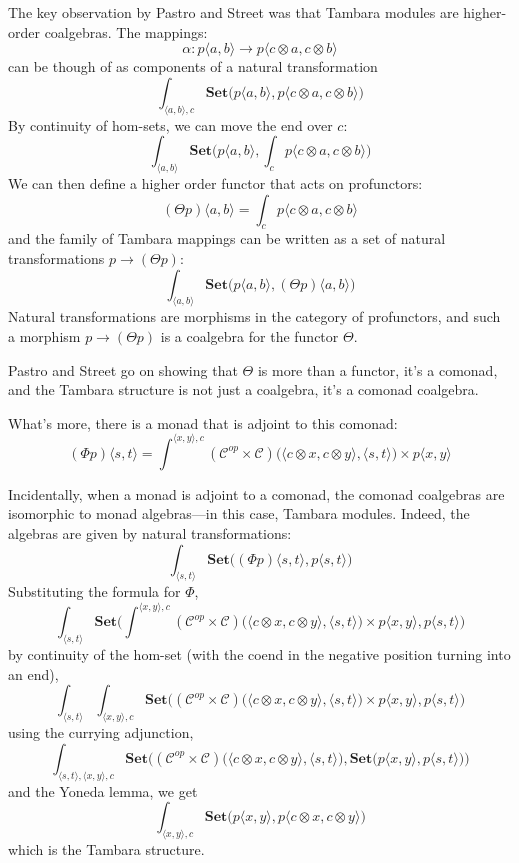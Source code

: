 \documentclass[11pt]{amsart}
\begin{document}
The key observation by Pastro and Street was that Tambara modules are higher-order coalgebras. The mappings:
\[ \alpha \colon p \langle a, b \rangle \to p\langle c \otimes a, c \otimes b \rangle \]
can be though of as components of a natural transformation
\[ \int_{\langle a, b \rangle, c} \mathbf{Set} \big( p \langle a, b \rangle, p\langle c \otimes a, c \otimes b \rangle \big) \]
By continuity of hom-sets, we can move the end over $c$:
\[ \int_{\langle a, b \rangle} \mathbf{Set} \big( p \langle a, b \rangle, \int_c p\langle c \otimes a, c \otimes b \rangle \big) \]
We can then define a higher order functor that acts on profunctors:
\[ (\Theta p)\langle a, b \rangle =  \int_c p\langle c \otimes a, c \otimes b \rangle \]
and the family of Tambara mappings can be written as a set of natural transformations $p \to (\Theta p)$:
\[ \int_{\langle a, b \rangle} \mathbf{Set} \big( p \langle a, b \rangle, (\Theta p)\langle a, b \rangle \big) \]
Natural transformations are morphisms in the category of profunctors, and such a morphism $p \to (\Theta p)$ is a coalgebra for the functor $\Theta$.

Pastro and Street go on showing that $\Theta$ is more than a functor, it's a comonad, and the Tambara structure is not just a coalgebra, it's a comonad coalgebra. 

What's more, there is a monad that is adjoint to this comonad:
\[ (\Phi p) \langle s, t \rangle = \int^{\langle x, y \rangle, c} (\mathcal{C}^{op} \times \mathcal{C})\big(\langle c \otimes x, c \otimes y \rangle, \langle s, t \rangle \big) \times p \langle x, y \rangle\]

Incidentally, when a monad is adjoint to a comonad, the comonad coalgebras are isomorphic to monad algebras---in this case, Tambara modules. Indeed, the algebras are given by natural transformations:
\[ \int_{\langle s, t \rangle} \mathbf{Set}\Big( (\Phi p) \langle s, t \rangle, p\langle s, t \rangle \Big) \]
Substituting the formula for $\Phi$,
\[ \int_{\langle s, t \rangle} \mathbf{Set}\Big( \int^{\langle x, y \rangle, c} (\mathcal{C}^{op} \times \mathcal{C})\big(\langle c \otimes x, c \otimes y \rangle, \langle s, t \rangle \big) \times p \langle x, y \rangle, p\langle s, t \rangle \Big)\]
by continuity of the hom-set (with the coend in the negative position turning into an end),
\[ \int_{\langle s, t \rangle} \int_{\langle x, y \rangle, c}\mathbf{Set}\Big(  (\mathcal{C}^{op} \times \mathcal{C})\big(\langle c \otimes x, c \otimes y \rangle, \langle s, t \rangle \big) \times p \langle x, y \rangle, p\langle s, t \rangle \Big)\]
using the currying adjunction,
\[ \int_{\langle s, t \rangle, \langle x, y \rangle, c}\mathbf{Set}\Big(  (\mathcal{C}^{op} \times \mathcal{C})\big(\langle c \otimes x, c \otimes y \rangle, \langle s, t \rangle \big),   \mathbf{Set}\big( p \langle x, y \rangle, p\langle s, t \rangle \big) \Big)\]
and the Yoneda lemma, we get
\[ \int_{\langle x, y \rangle, c}    \mathbf{Set}\big( p \langle x, y \rangle, p\langle c \otimes x, c \otimes y \rangle \big) \]
which is the Tambara structure.
\end{document}
